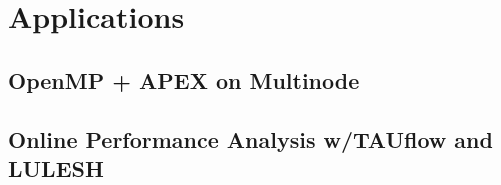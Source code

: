 
\section{Applications}


\subsection{OpenMP + APEX on Multinode}



\subsection{Online Performance Analysis w/TAUflow and LULESH}



